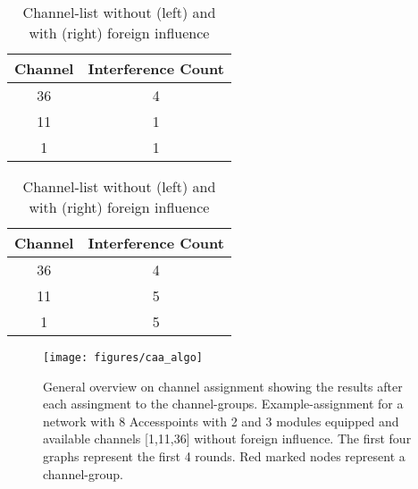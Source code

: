     \begin{table}[h!]
      \centering
      \begin{tabular}{|c|c|}\hline
	Channel & Interference Count\\ \hline
	36 & 4 \\ \hline
	11 & 1 \\ \hline
	1 & 1 \\ \hline
      \end{tabular}
      \begin{tabular}{|c|c|}\hline
	Channel & Interference Count\\ \hline
	36 & 4 \\ \hline
	11 & 5 \\ \hline
	1 & 5  \\ \hline
      \end{tabular}
      \caption{Channel-list without (left) and with (right) foreign influence}
    \end{table}
    
    \newpage
    
    \begin{figure}[h!]
      \centering
      \texttt{[image: figures/caa\_algo]}
      \caption{General overview on channel assignment showing the results after each assingment to the channel-groups. 
	Example-assignment for a network with 8 Accesspoints with 2 and 3 modules equipped and available channels [1,11,36] without foreign influence. 
	The first four graphs represent the first 4 rounds. Red marked nodes represent a channel-group.}
      \label{fig:caa_algo}
    \end{figure}

